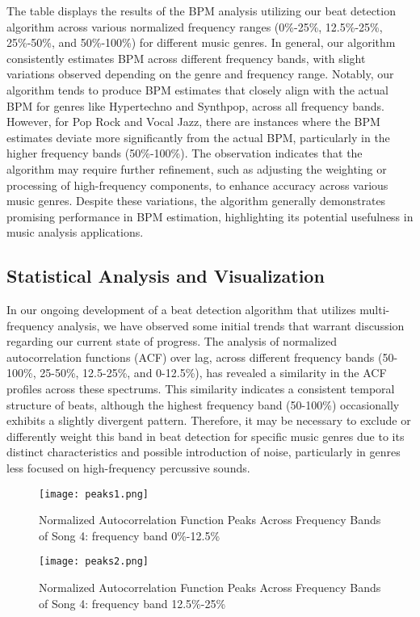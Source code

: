 The table displays the results of the BPM analysis utilizing our beat detection algorithm across various normalized frequency ranges (0\%-25\%, 12.5\%-25\%, 25\%-50\%, and 50\%-100\%) for different music genres. In general, our algorithm consistently estimates BPM across different frequency bands, with slight variations observed depending on the genre and frequency range. Notably, our algorithm tends to produce BPM estimates that closely align with the actual BPM for genres like Hypertechno and Synthpop, across all frequency bands. However, for Pop Rock and Vocal Jazz, there are instances where the BPM estimates deviate more significantly from the actual BPM, particularly in the higher frequency bands (50\%-100\%). The observation indicates that the algorithm may require further refinement, such as adjusting the weighting or processing of high-frequency components, to enhance accuracy across various music genres. Despite these variations, the algorithm generally demonstrates promising performance in BPM estimation, highlighting its potential usefulness in music analysis applications.

\subsection{Statistical Analysis and Visualization}
In our ongoing development of a beat detection algorithm that utilizes multi-frequency analysis, we have observed some initial trends that warrant discussion regarding our current state of progress. The analysis of normalized autocorrelation functions (ACF) over lag, across different frequency bands (50-100\%, 25-50\%, 12.5-25\%, and 0-12.5\%), has revealed a similarity in the ACF profiles across these spectrums. This similarity indicates a consistent temporal structure of beats, although the highest frequency band (50-100\%) occasionally exhibits a slightly divergent pattern. Therefore, it may be necessary to exclude or differently weight this band in beat detection for specific music genres due to its distinct characteristics and possible introduction of noise, particularly in genres less focused on high-frequency percussive sounds.

\begin{figure}[H]
    \centering
    \texttt{[image: peaks1.png]}
    \caption{Normalized Autocorrelation Function Peaks Across Frequency Bands of Song 4: frequency band 0\%-12.5\%}
\end{figure}

\begin{figure}[H]
    \centering
    \texttt{[image: peaks2.png]}
    \caption{Normalized Autocorrelation Function Peaks Across Frequency Bands of Song 4: frequency band 12.5\%-25\%}
\end{figure}

